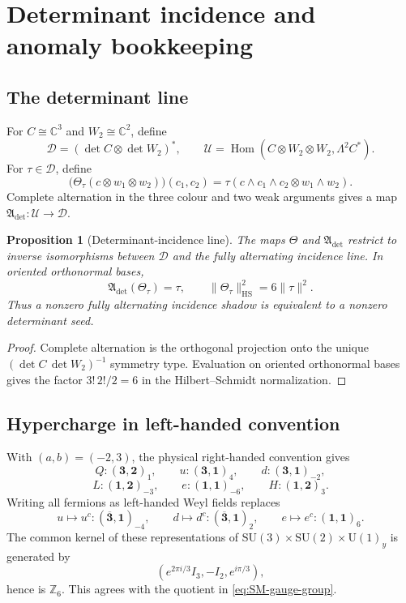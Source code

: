 \documentclass[11pt]{article}
\newtheorem{proposition}[theorem]{Proposition}
\theoremstyle{definition}
\theoremstyle{remark}
\newcommand{\Z}{\mathbb Z}
\newcommand{\C}{\mathbb C}
\newcommand{\Hom}{\operatorname{Hom}}
\newcommand{\U}{\mathrm U}
\newcommand{\SU}{\mathrm{SU}}
\newcommand{\HS}{\mathrm{HS}}
\newcommand{\norm}[1]{\lVert#1\rVert}
\begin{document}

\section{Determinant incidence and anomaly bookkeeping}
\label{app:anomaly}

\subsection{The determinant line}

For $C\cong\C^3$ and $W_2\cong\C^2$, define
\[
\mathscr D=(\det C\otimes\det W_2)^*,
\qquad
\mathscr U=
\Hom(C\otimes W_2\otimes W_2,\Lambda^2C^*).
\]
For $\tau\in\mathscr D$, define
\[
\bigl(\Theta_\tau(c\otimes w_1\otimes w_2)\bigr)(c_1,c_2)
=
\tau(c\wedge c_1\wedge c_2\otimes w_1\wedge w_2).
\]
Complete alternation in the three colour and two weak arguments gives a map
$\mathfrak A_{\det}:\mathscr U\to\mathscr D$.

\begin{proposition}[Determinant-incidence line]
\label{prop:det-incidence}
The maps $\Theta$ and $\mathfrak A_{\det}$ restrict to inverse isomorphisms
between $\mathscr D$ and the fully alternating incidence line.  In oriented
orthonormal bases,
\[
\mathfrak A_{\det}(\Theta_\tau)=\tau,
\qquad
\norm{\Theta_\tau}_{\HS}^2=6\norm{\tau}^2.
\]
Thus a nonzero fully alternating incidence shadow is equivalent to a nonzero
determinant seed.
\end{proposition}

\begin{proof}
Complete alternation is the orthogonal projection onto the unique
$(\det C\,\det W_2)^{-1}$ symmetry type.  Evaluation on oriented orthonormal
bases gives the factor $3!\,2!/2=6$ in the Hilbert--Schmidt normalization.
\end{proof}

\subsection{Hypercharge in left-handed convention}

With $(a,b)=(-2,3)$, the physical right-handed convention gives
\[
Q:(\mathbf3,\mathbf2)_1,\qquad
u:(\mathbf3,\mathbf1)_4,\qquad
d:(\mathbf3,\mathbf1)_{-2},
\]
\[
L:(\mathbf1,\mathbf2)_{-3},\qquad
e:(\mathbf1,\mathbf1)_{-6},\qquad
H:(\mathbf1,\mathbf2)_3.
\]
Writing all fermions as left-handed Weyl fields replaces
\[
u\mapsto u^c:(\overline{\mathbf3},\mathbf1)_{-4},
\qquad
d\mapsto d^c:(\overline{\mathbf3},\mathbf1)_2,
\qquad
e\mapsto e^c:(\mathbf1,\mathbf1)_6.
\]
The common kernel of these representations of
$\SU(3)\times\SU(2)\times\U(1)_y$ is generated by
\[
\left(e^{2\pi i/3}I_3,-I_2,e^{i\pi/3}\right),
\]
hence is $\Z_6$.  This agrees with the quotient in
\eqref{eq:SM-gauge-group}.
\end{document}
